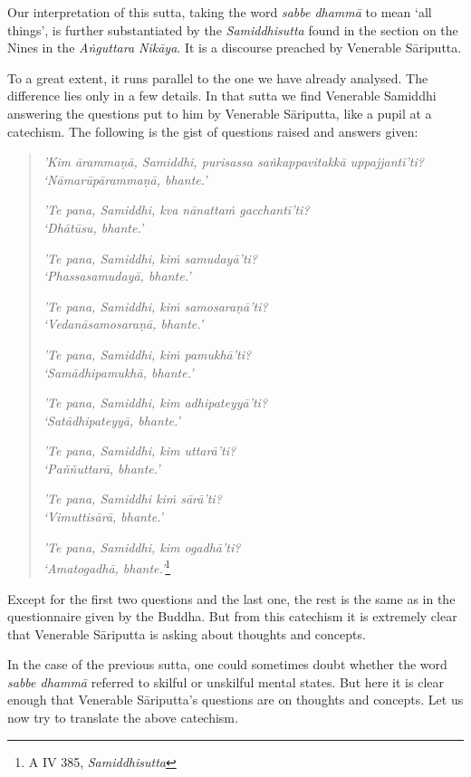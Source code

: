 Our interpretation of this sutta, taking the word \emph{sabbe dhammā} to mean `all things', is further substantiated by the \emph{Samiddhisutta} found in the section on the Nines in the \emph{Aṅguttara Nikāya}. It is a discourse preached by Venerable Sāriputta.

To a great extent, it runs parallel to the one we have already analysed. The difference lies only in a few details. In that sutta we find Venerable Samiddhi answering the questions put to him by Venerable Sāriputta, like a pupil at a catechism. The following is the gist of questions raised and answers given:

\begin{quote}
\emph{'Kim ārammaṇā, Samiddhi, purisassa saṅkappavitakkā uppajjantī'ti?}\\
\emph{`Nāmarūpārammaṇā, bhante.'}

\emph{'Te pana, Samiddhi, kva nānattaṁ gacchantī'ti?}\\
\emph{`Dhātūsu, bhante.'}

\emph{'Te pana, Samiddhi, kiṁ samudayā'ti?}\\
\emph{`Phassasamudayā, bhante.'}

\emph{'Te pana, Samiddhi, kiṁ samosaraṇā'ti?}\\
\emph{`Vedanāsamosaraṇā, bhante.'}

\emph{'Te pana, Samiddhi, kiṁ pamukhā'ti?}\\
\emph{`Samādhipamukhā, bhante.'}

\emph{'Te pana, Samiddhi, kim adhipateyyā'ti?}\\
\emph{`Satādhipateyyā, bhante.'}

\emph{'Te pana, Samiddhi, kim uttarā'ti?}\\
\emph{`Paññuttarā, bhante.'}

\emph{'Te pana, Samiddhi kiṁ sārā'ti?}\\
\emph{`Vimuttisārā, bhante.'}

\emph{'Te pana, Samiddhi, kim ogadhā'ti?}\\
\emph{`Amatogadhā, bhante.'}\footnote{A IV 385, \emph{Samiddhisutta}}
\end{quote}

Except for the first two questions and the last one, the rest is the same as in the questionnaire given by the Buddha. But from this catechism it is extremely clear that Venerable Sāriputta is asking about thoughts and concepts.

In the case of the previous sutta, one could sometimes doubt whether the word \emph{sabbe dhammā} referred to skilful or unskilful mental states. But here it is clear enough that Venerable Sāriputta's questions are on thoughts and concepts. Let us now try to translate the above catechism.

